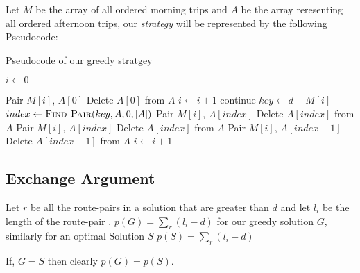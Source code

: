 \documentclass[8pt]{article}
\begin{document}
Let $M$ be the array of all ordered morning trips and $A$ be the array reresenting all ordered afternoon trips, our \textit{strategy} will be represented by the following Pseudocode:

\begin{algorithm}
\caption{Pseudocode of our greedy stratgey}\label{euclid}
\begin{algorithmic}[1]

\State $i \leftarrow 0$

        \State Pair $M[i]$, $A[0]$
        \State Delete $A[0]$ from $A$
        \State $i \leftarrow i + 1$
        \State continue
    \EndIf
    \State $key \leftarrow d - M[i]$
    \State $index \leftarrow \Call{Find-Pair}{key, A, 0, \left\vert{A}\right\vert}$
        \State Pair $M[i]$, $A[index]$
        \State Delete $A[index]$ from $A$
    \Else
            \State Pair $M[i]$, $A[index]$
            \State Delete $A[index]$ from $A$
        \Else
            \State Pair $M[i]$, $A[index - 1]$
            \State Delete $A[index - 1]$ from $A$
        \EndIf
    \EndIf
    \State $i \leftarrow i + 1$
\EndWhile
\EndProcedure
\end{algorithmic}
\end{algorithm}

\subsection{Exchange Argument}
Let $r$ be all the route-pairs in a solution that are greater than $d$ and let $l_i$ be the length of the route-pair . $p(G) = \sum_{r}(l_i - d)$ for our greedy solution $G$, similarly for an optimal Solution $S$ $p(S) = \sum_{r}(l_i - d)$

If, $G = S$ then clearly $p(G) = p(S)$.
\end{document}
